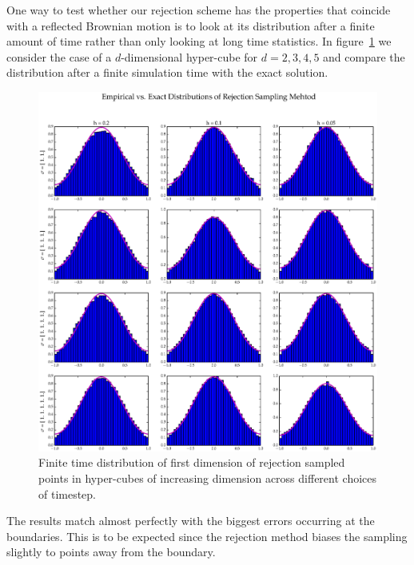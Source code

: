 One way to test whether our rejection scheme has the properties that coincide with a reflected Brownian motion is to look at its distribution after a finite amount of time rather than only looking at long time statistics. In figure~\ref{fig:HCFin} we consider the case of a $d$-dimensional hyper-cube for $d = 2, 3, 4, 5$  and compare the distribution after a finite simulation time with the exact solution. 
\begin{figure}[ht]
\centering
  \includegraphics[scale=0.4, angle=0]{images/rejection_finite.eps}
\caption{Finite time distribution of first dimension of rejection sampled points in hyper-cubes of increasing dimension across different choices of timestep.}
\label{fig:HCFin}
\end{figure}
The results match almost perfectly with the biggest errors occurring at the boundaries. This is to be expected since the rejection method biases the sampling slightly to points away from the boundary. 

